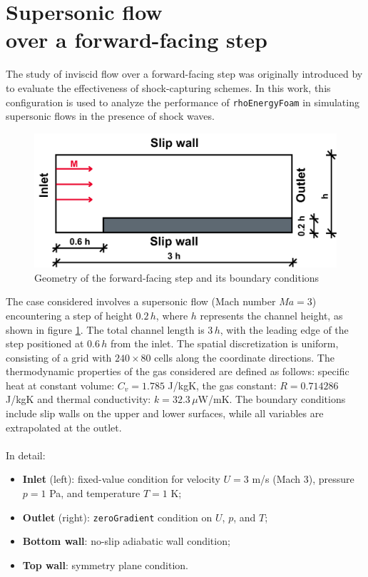 \documentclass[a5paper]{sapthesis}
\begin{document}
	\section{Supersonic flow \\ over a forward-facing step}
	The study of inviscid flow over a forward-facing step was originally introduced by \citet{EMERY1968306} to evaluate the effectiveness of shock-capturing schemes. In this work, this configuration is used to analyze the performance of \texttt{rhoEnergyFoam} in simulating supersonic flows in the presence of shock waves.
	
	\begin{figure}
		\centering
		\includegraphics[width=0.8 \linewidth]{Figures/FS_Geometry}
		\caption{Geometry of the forward-facing step and its boundary conditions}
		\label{FS_Geometry}
	\end{figure} 
	
	\noindent The case considered involves a supersonic flow (Mach number $Ma = 3$) encountering a step of height $0.2\,h$, where $h$ represents the channel height, as shown in figure \ref{FS_Geometry}. The total channel length is $3\,h$, with the leading edge of the step positioned at $0.6\,h$ from the inlet. The spatial discretization is uniform, consisting of a grid with $240 \times 80$ cells along the coordinate directions. 	The thermodynamic properties of the gas considered are defined as follows: specific heat at constant volume: $C_v = 1.785$ J/kgK, the gas constant: $R = 0.714286$ J/kgK and thermal conductivity: $k = 32.3 \,\mu$W/mK. The boundary conditions include slip walls on the upper and lower surfaces, while all variables are extrapolated at the outlet. \\
	\\
	In detail:
	
	\begin{itemize}
		\item \textbf{Inlet} (left): fixed-value condition for velocity $U = 3$ m/s (Mach 3), pressure $p = 1$ Pa, and temperature $T = 1$ K;
		\item \textbf{Outlet} (right): \texttt{zeroGradient} condition on $U$, $p$, and $T$;
		\item \textbf{Bottom wall}: no-slip adiabatic wall condition;
		\item \textbf{Top wall}: symmetry plane condition.
	\end{itemize}
\end{document}

